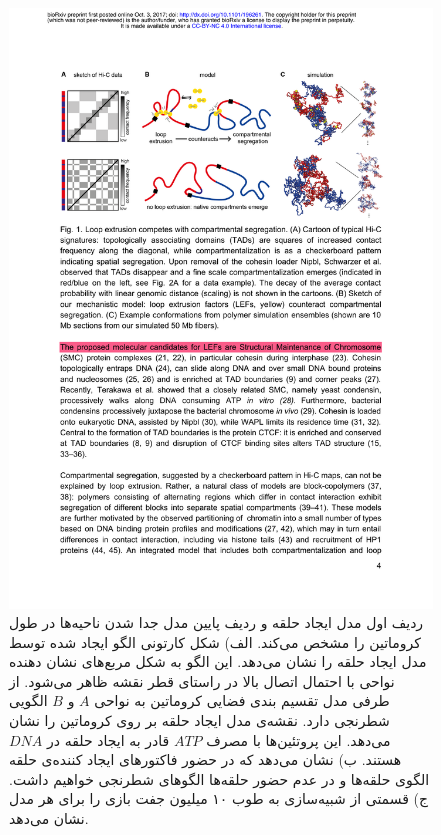 \begin{figure}[htbp]
\begin{center}
\includegraphics[width=5.5in]{Figs/TAD_loops}
\caption{
ردیف اول مدل ایجاد حلقه و ردیف پایین مدل جدا شدن ناحیه‌ها در طول کروماتین را مشخص می‌کند. الف) شکل کارتونی  الگو ایجاد شده توسط مدل ایجاد حلقه‌ را نشان می‌دهد. این الگو به شکل مربع‌های نشان دهنده نواحی با احتمال اتصال بالا در راستای قطر نقشه‌ ظاهر می‌شود. از طرفی مدل تقسیم بندی فضایی کروماتین به نواحی $A$ و $B$ الگویی شطرنجی دارد. نقشه‌ی مدل ایجاد حلقه بر روی کروماتین را نشان می‌دهد. این پروتئین‌ها با مصرف $ATP$ قادر به ایجاد حلقه در $DNA$ هستند. ب) نشان می‌دهد که در حضور فاکتورهای ایجاد کننده‌ی حلقه الگوی حلقه‌ها  و در عدم حضور حلقه‌ها الگوهای شطرنجی خواهیم داشت. ج) قسمتی از شبیه‌سازی به طوب ۱۰ میلیون جفت بازی را برای هر مدل نشان می‌دهد.
}
\label{fig:TADloops}
\end{center}
\end{figure}

